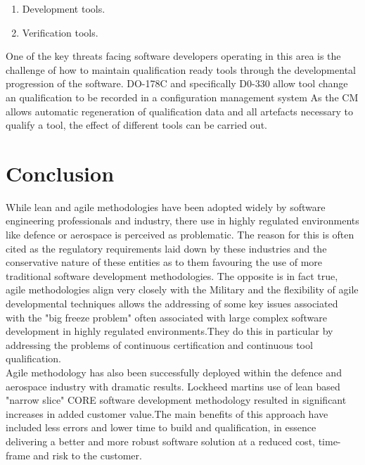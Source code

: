 \documentclass[11pt,twocolumn]{article}
\begin{document}
\begin{enumerate}
\item Development tools.
\item Verification tools.
\end{enumerate}
One of the key threats facing software developers operating in this area is the challenge of how to maintain qualification ready tools through the developmental progression of the software. DO-178C and specifically D0-330 allow tool change an qualification to be recorded in a configuration management system  As the CM allows automatic regeneration of qualification data and all artefacts necessary to qualify a tool, the effect of different tools can be carried out.
\section*{\textbf{Conclusion}}
While lean and agile methodologies have been adopted widely by software engineering professionals and industry, there use in highly regulated environments like defence or aerospace is perceived as problematic. The reason for this is often cited as the regulatory requirements laid down by these industries and the conservative nature of these entities as to them favouring the use of more traditional software development methodologies. The opposite is in fact true, agile methodologies align very closely with the Military and the flexibility of  agile developmental techniques allows the addressing of some key issues associated with the "big freeze problem" often associated with large complex software development in highly regulated environments.They do this in particular by addressing the problems of continuous certification and continuous tool qualification.
\\
Agile methodology has also been successfully deployed within the defence and aerospace industry with dramatic results. Lockheed martins use of lean based "narrow slice" CORE software development methodology resulted in significant increases in added customer value.The main benefits of this approach have included less errors and lower time to build and qualification, in essence delivering a better and more robust software solution at a reduced cost, time-frame and risk to the customer.

\end{document}
